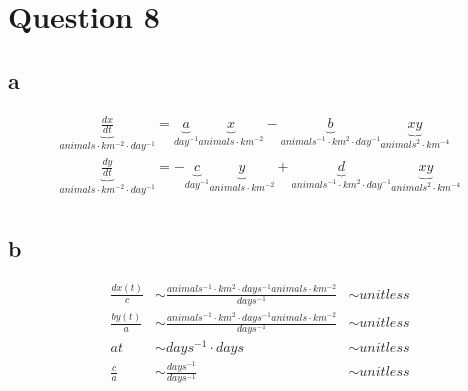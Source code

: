 \documentclass{unswmaths}
\begin{document}
\section*{Question 8}
\subsection*{a}
    \begin{align*}
        \underbrace{\frac{dx}{dt}}_{animals\cdot km^{-2} \cdot day^{-1}} = \underbrace{a}_{day^{-1}}\underbrace{x}_{animals \cdot km^{-2}} - \underbrace{b}_{animals^{-1} \cdot km^{2} \cdot day^{-1}}\underbrace{xy}_{animals^{2} \cdot km^{-4}} \\
        \underbrace{\frac{dy}{dt}}_{animals\cdot km^{-2} \cdot day^{-1}} = -\underbrace{c}_{day^{-1}}\underbrace{y}_{animals \cdot km^{-2}} + \underbrace{d}_{animals^{-1} \cdot km^{2} \cdot day^{-1}}\underbrace{xy}_{animals^{2} \cdot km^{-4}} \\
    \end{align*}
\subsection*{b}
     \begin{align*}
        \frac{dx(t)}{c} &\sim \frac{animals^{-1} \cdot km^2 \cdot days^{-1} animals \cdot km^{-2}}{days^{-1}} &\sim unitless \\
        \frac{by(t)}{a} &\sim \frac{animals^{-1} \cdot km^2 \cdot days^{-1} animals \cdot km^{-2}}{days^{-1}} &\sim unitless \\
        at &\sim days^{-1} \cdot days &\sim unitless \\
        \frac{c}{a} &\sim \frac{days^{-1}}{days^{-1}} &\sim unitless
     \end{align*}
\end{document}
